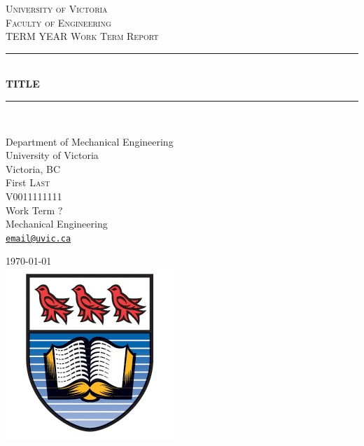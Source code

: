 \documentclass[12pt]{article}
\newcommand{\email}[1]{\href{mailto:#1}{\texttt{#1}}}
\begin{document}


\begin{titlepage}
\newcommand{\HRule}{\rule{\linewidth}{0.5mm}} 
\center 

\textsc{\LARGE University of Victoria}\\[0.25cm]
\textsc{\Large Faculty of Engineering}\\[0.5cm]
\textsc{\large TERM YEAR Work Term Report}\\[0.5cm] %

\HRule \\[0.4cm]
{ \huge \bfseries TITLE}\\ %
\HRule \\[1 cm]
 
\begin{center}\large
Department of Mechanical Engineering\\
University of Victoria\\
Victoria, BC\\[1cm]

First \textsc{Last}	\\ %
V0011111111	\\
Work Term ?	\\
Mechanical Engineering\\
\email{email@uvic.ca}\\[1cm]
\end{center}


{\large \today}\\[0.5cm] %

\includegraphics{UVic_logo}\\[0.5cm]



\end{titlepage}
\end{document}
